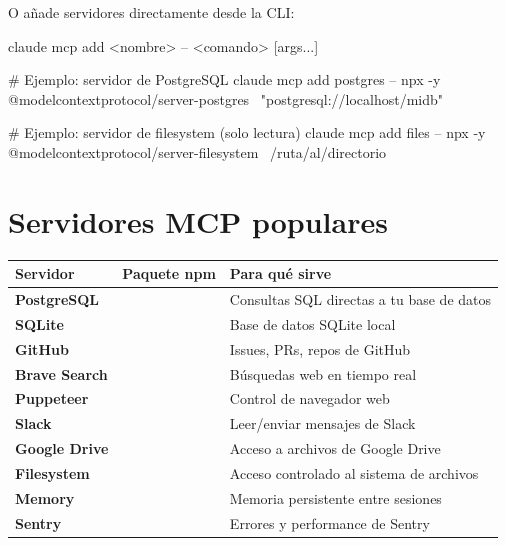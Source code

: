 \documentclass[11pt,a4paper]{report}
\DeclareRobustCommand{\texttt}[1]{{\ttfamily\seqsplit{#1}}}
\begin{document}
O añade servidores directamente desde la CLI:

\begin{codebox}
claude mcp add <nombre> -- <comando> [args...]

# Ejemplo: servidor de PostgreSQL
claude mcp add postgres -- npx -y @modelcontextprotocol/server-postgres \
  "postgresql://localhost/midb"

# Ejemplo: servidor de filesystem (solo lectura)
claude mcp add files -- npx -y @modelcontextprotocol/server-filesystem \
  /ruta/al/directorio
\end{codebox}

\section{Servidores MCP populares}

\begin{longtable}{>{\raggedright\arraybackslash}p{}>{\raggedright\arraybackslash}p{}>{\raggedright\arraybackslash}p{}}
\toprule
Servidor & Paquete npm & Para qué sirve \\\midrule
\textbf{PostgreSQL} & \texttt{@modelcontextprotocol/server-postgres} & Consultas SQL directas a tu base de datos \\
\textbf{SQLite} & \texttt{@modelcontextprotocol/server-sqlite} & Base de datos SQLite local \\
\textbf{GitHub} & \texttt{@modelcontextprotocol/server-github} & Issues, PRs, repos de GitHub \\
\textbf{Brave Search} & \texttt{@modelcontextprotocol/server-brave-search} & Búsquedas web en tiempo real \\
\textbf{Puppeteer} & \texttt{@modelcontextprotocol/server-puppeteer} & Control de navegador web \\
\textbf{Slack} & \texttt{@modelcontextprotocol/server-slack} & Leer/enviar mensajes de Slack \\
\textbf{Google Drive} & \texttt{@modelcontextprotocol/server-gdrive} & Acceso a archivos de Google Drive \\
\textbf{Filesystem} & \texttt{@modelcontextprotocol/server-filesystem} & Acceso controlado al sistema de archivos \\
\textbf{Memory} & \texttt{@modelcontextprotocol/server-memory} & Memoria persistente entre sesiones \\
\textbf{Sentry} & \texttt{@modelcontextprotocol/server-sentry} & Errores y performance de Sentry \\
\bottomrule
\end{longtable}
\end{document}
